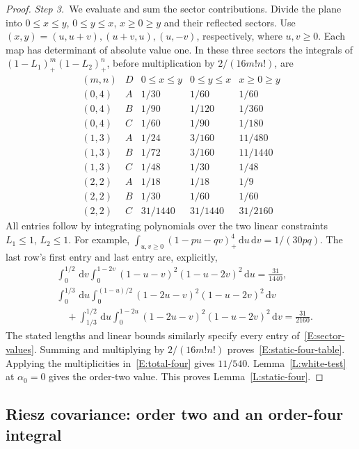 \documentclass[12pt,oneside,openany]{book}
\numberwithin{equation}{section}
\theoremstyle{nogostyle}
\theoremstyle{definition}
\newcommand{\ud}{\,\mathrm{d}}
\begin{document}
\begin{proof}
  \medskip
  \noindent\textit{Step 3.~}We evaluate and sum the sector contributions.
  Divide the plane into $0 \le x \le y$, $0 \le y \le x$, $x \ge 0 \ge y$ and
  their reflected sectors. Use $(x,y) = (u,u+v),(u+v,u),(u,-v)$, respectively,
  where $u,v \ge 0$. Each map has determinant of absolute value one. In these
  three sectors the integrals of $(1-L_1)_+^m(1-L_2)_+^n$, before multiplication
  by $2/(16m!n!)$, are
  \begin{equation}\label{E:sector-values}
    \begin{array}{c|c|ccc}
      (m,n)&D&0\le x\le y&0\le y\le x&x\ge0\ge y\\ \hline
      (0,4)&A&1/30&1/60&1/60\\
      (0,4)&B&1/90&1/120&1/360\\
      (0,4)&C&1/60&1/90&1/180\\
      (1,3)&A&1/24&3/160&11/480\\
      (1,3)&B&1/72&3/160&11/1440\\
      (1,3)&C&1/48&1/30&1/48\\
      (2,2)&A&1/18&1/18&1/9\\
      (2,2)&B&1/30&1/60&1/60\\
      (2,2)&C&31/1440&31/1440&31/2160
    \end{array}
  \end{equation}
  All entries follow by integrating polynomials over the two linear constraints
  $L_1 \le 1$, $L_2 \le 1$. For example, $\int_{u,v\ge0}(1-pu-qv)_+^4\ud u\ud v
  = 1/(30pq)$. The last row's first entry and last entry are, explicitly,
  \[
    \begin{split}
      &\int_0^{1/2}\ud v\int_0^{1-2v}
      (1-u-v)^2(1-u-2v)^2\ud u=\frac{31}{1440},\\
      &\int_0^{1/3}\ud u\int_0^{(1-u)/2}
      (1-2u-v)^2(1-u-2v)^2\ud v\\
      &\quad+\int_{1/3}^{1/2}\ud u\int_0^{1-2u}
      (1-2u-v)^2(1-u-2v)^2\ud v=\frac{31}{2160}.
    \end{split}
  \]
  The stated lengths and linear bounds similarly specify every entry
  of~\eqref{E:sector-values}. Summing and multiplying by $2/(16m!n!)$
  proves~\eqref{E:static-four-table}. Applying the multiplicities
  in~\eqref{E:total-four} gives $11/540$. Lemma~\ref{L:white-test} at $\alpha_0
  = 0$ gives the order-two value. This proves Lemma~\ref{L:static-four}.
\end{proof}

\subsection{Riesz covariance: order two and an order-four integral}
\end{document}
